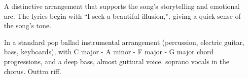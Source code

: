 
\label{sec:a-someone-or-a-someone}

\begin{notes}
A distinctive arrangement that supports the song's storytelling and emotional arc. %
The lyrics begin with “I seek a beautiful illusion,”, giving a quick sense of the song’s tone.
\end{notes}

\begin{style}
In a standard pop ballad instrumental arrangement (percussion, electric guitar, bass, keyboards), with C major - A minor - F major - G major chord progressions, and a deep bass, almost guttural voice. %
soprano vocals in the chorus. %
Outtro riff.
\end{style}

